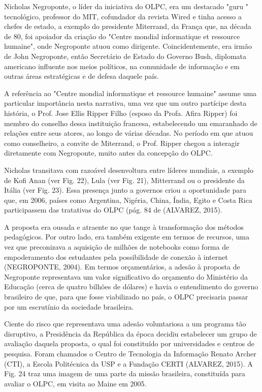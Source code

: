 Nicholas Negroponte, o líder da iniciativa do OLPC, era um destacado "guru " tecnológico, professor do MIT, cofundador da revista Wired e tinha acesso a chefes de estado, a exemplo do presidente Miterrand, da França que, na década de 80, foi apoiador da criação do "Centre mondial informatique et ressource humaine", onde Negroponte atuou como dirigente. Coincidentemente, era irmão de John Negroponte, então Secretário de Estado do Governo Bush, diplomata americano influente nos meios políticos, na comunidade de informação e em outras áreas estratégicas e de defesa daquele país.

A referência ao "Centre mondial informatique et ressource humaine" assume uma particular importância nesta narrativa, uma vez que um outro partícipe desta história, o Prof. Jose Ellis Ripper Filho (esposo da Profa. Afira Ripper) foi membro do conselho dessa instituição francesa, estabelecendo um emaranhado de relações entre seus atores, ao longo de várias décadas. No período em que atuou como conselheiro, a convite de Miterrand, o Prof. Ripper chegou a interagir diretamente com Negroponte, muito antes da concepção do OLPC.

Nicholas transitava com razoável desenvoltura entre líderes mundiais, a exemplo de Kofi Anan (ver Fig. 22), Lula (ver Fig. 21), Mitterrand ou o presidente da Itália (ver Fig. 23). Essa presença junto a governos criou a oportunidade para que, em 2006, países como Argentina, Nigéria, China, Índia, Egito e Costa Rica participassem das tratativas do OLPC  (pág. 84 de (ALVAREZ, 2015).

A proposta era ousada e atraente no que tange à transformação dos métodos pedagógicos. Por outro lado, era também exigente em termos de recursos, uma vez que preconizava a aquisição de milhões de notebooks como forma de empoderamento dos estudantes pela possibilidade de conexão à internet  (NEGROPONTE, 2004). Em termos orçamentários, a adesão à proposta de Negroponte representava um valor significativo do orçamento do Ministério da Educação (cerca de quatro bilhões de dólares) e havia o entendimento do governo brasileiro de que, para que fosse viabilizado no país, o OLPC precisaria passar por um escrutínio da sociedade brasileira.

Ciente do risco que representava uma adesão voluntariosa a um programa tão disruptivo, a Presidência da República da época decidiu estabelecer um grupo de avaliação  daquela proposta, o  qual foi constituído por universidades e centros de pesquisa. Foram chamados o Centro de Tecnologia da Informação Renato Archer (CTI), a Escola Politécnica da USP e a Fundação CERTI (ALVAREZ, 2015). A Fig. 24 traz uma imagem de uma parte da missão brasileira, constituída para avaliar o OLPC, em visita ao Maine em 2005.

